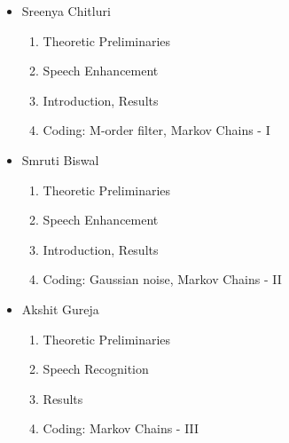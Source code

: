 \documentclass[10pt,twocolumn,letterpaper]{article}
\begin{document}
\begin{itemize}

\newline
\item\large Sreenya Chitluri
\begin{enumerate}
    \item Theoretic Preliminaries
    \item Speech Enhancement
    \item Introduction, Results 
    \item Coding: M-order filter, Markov Chains - I
\end{enumerate}
\item\large Smruti Biswal
\begin{enumerate}
    \item Theoretic Preliminaries
    \item Speech Enhancement
    \item Introduction, Results
    \item Coding: Gaussian noise, Markov Chains - II
\end{enumerate}
\item\large Akshit Gureja
\begin{enumerate}
    \item Theoretic Preliminaries
    \item Speech Recognition 
    \item Results
    \item Coding: Markov Chains - III
\end{enumerate}
\end{itemize}
\end{document}
